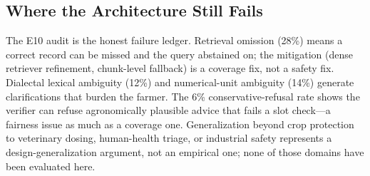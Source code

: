\subsection{Where the Architecture Still Fails}
The E10 audit is the honest failure ledger. Retrieval omission (28\%) means a correct record can be missed and the query abstained on; the mitigation (dense retriever refinement, chunk-level fallback) is a coverage fix, not a safety fix. Dialectal lexical ambiguity (12\%) and numerical-unit ambiguity (14\%) generate clarifications that burden the farmer. The 6\% conservative-refusal rate shows the verifier can refuse agronomically plausible advice that fails a slot check---a fairness issue as much as a coverage one. Generalization beyond crop protection to veterinary dosing, human-health triage, or industrial safety represents a design-generalization argument, not an empirical one; none of those domains have been evaluated here.
